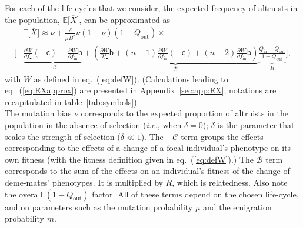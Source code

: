 \documentclass[11pt, letterpaper]{article}
\renewcommand{\eqref}[1]{\textup{{\normalfont eq.~(\ref{#1}}\normalfont)}}
\newcommand{\ie}{\textit{i.e.}}
\newcommand{\derivn}[2]{\frac{\partial #1}{\partial #2}}
\newcommand{\Esp}[1]{\mathbb{E}\big[ #1\big]}%
\newcommand{\appname}[0]{Appendix}
\newcommand{\bb}{\mathsf{b}}
\newcommand{\cc}{\mathsf{c}}
\newcommand{\mutbias}{\nu}
\newcommand{\inn}{\textrm{in}}
\newcommand{\out}{\textrm{out}}
\newcommand{\focal}{\bullet}
\newcommand{\Qout}{Q_{\out}}
\newcommand{\selstr}{\delta}
\begin{document}
For each of the life-cycles that we consider, the expected frequency of altruists in the population, $\Esp{\overline{X}}$, can be approximated as
\begin{equation}\label{eq:EXapprox}
\begin{split}
& \Esp{\overline{X}} \approx \mutbias + 
\frac{\selstr}{\mu B^*}  \mutbias (1-\mutbias) (1 - Q_{\out}) \times \\
 \Bigg[ &\underbrace{ \derivn{W}{f_{\focal}} (-\cc) + \derivn{W}{f_{\inn}} \bb}_{-\mathcal{C}} + \underbrace{ \left( \derivn{W}{f_{\focal}} \bb + (n-1) \derivn{W}{f_{\inn}} (-\cc) + (n-2) \derivn{W}{f_{\inn}} \bb \right) }_{\mathcal{B}} \underbrace{\frac{Q_{\inn} - Q_{\out}}{1 - Q_{\out}}}_{R} \Bigg],
\end{split}
\end{equation}
%
with $W$ as defined in \eqref{eq:defW}. (Calculations leading to \eqref{eq:EXapprox} are presented in  \appname~\ref{sec:app:EX}; notations are recapitulated in table~\ref{tab:symbols})\\
The mutation bias $\mutbias$ corresponds to the expected proportion of altruists in the population in the absence of selection (\ie, when $\selstr = 0$); $\selstr$ is the parameter that scales the strength of selection ($\selstr \ll 1$). The $-\mathcal{C}$ term groups the effects corresponding to the effects of a change of a focal individual's phenotype on its own fitness (with the fitness definition given in \eqref{eq:defW}.) The $\mathcal{B}$ term corresponds to the sum of the effects on an individual's fitness of the change of deme-mates' phenotypes. It is multiplied by $R$, which is relatedness. Also note the overall $(1-\Qout)$ factor. All of these terms depend on the chosen life-cycle, and on parameters such as the mutation probability $\mu$ and the emigration probability $m$. 
\end{document}
